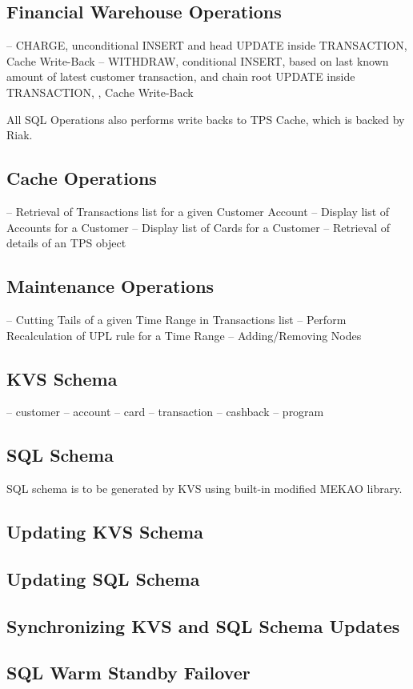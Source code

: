 \subsection{Financial Warehouse Operations}

-- CHARGE, unconditional INSERT and head UPDATE inside TRANSACTION, Cache Write-Back
-- WITHDRAW, conditional INSERT, based on last known amount of latest customer transaction, and chain root UPDATE inside TRANSACTION, , Cache Write-Back

All SQL Operations also performs write backs to TPS Cache, which is backed by Riak.

\subsection{Cache Operations}

-- Retrieval of Transactions list for a given Customer Account
-- Display list of Accounts for a Customer
-- Display list of Cards for a Customer
-- Retrieval of details of an TPS object

\subsection{Maintenance Operations}

-- Cutting Tails of a given Time Range in Transactions list
-- Perform Recalculation of UPL rule for a Time Range
-- Adding/Removing Nodes

\subsection{KVS Schema}

-- customer
-- account
-- card
-- transaction
-- cashback
-- program

\subsection{SQL Schema}

SQL schema is to be generated by KVS using built-in modified MEKAO library.

\subsection{Updating KVS Schema}

\subsection{Updating SQL Schema}

\subsection{Synchronizing KVS and SQL Schema Updates}

\subsection{SQL Warm Standby Failover}
